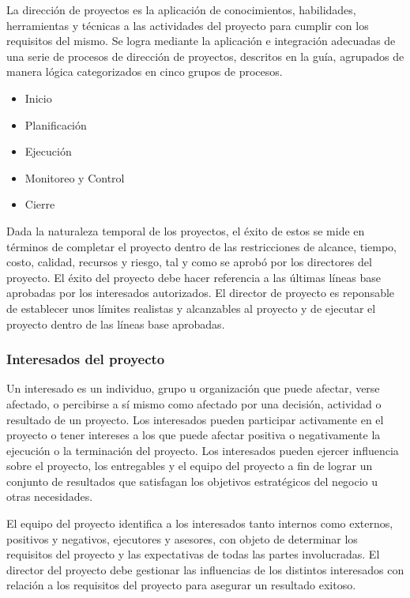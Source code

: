 La dirección de proyectos es la aplicación de conocimientos, habilidades, herramientas y técnicas a las actividades del proyecto para cumplir con los requisitos del mismo. Se logra mediante la aplicación e integración adecuadas de una serie de procesos de dirección de proyectos, descritos en la guía, agrupados de manera lógica categorizados en cinco grupos de procesos.

\begin{itemize}
\item{Inicio}
\item{Planificación}
\item{Ejecución}
\item{Monitoreo y Control}
\item{Cierre}
\end{itemize}

Dada la naturaleza temporal de los proyectos, el éxito de estos se mide en términos de completar el proyecto dentro de las restricciones de alcance, tiempo, costo, calidad, recursos y riesgo, tal y como se aprobó por los directores del proyecto. El éxito del proyecto debe hacer referencia a las últimas líneas base aprobadas por los interesados autorizados. El director de proyecto es reponsable de establecer unos límites realistas y alcanzables al proyecto y de ejecutar el proyecto dentro de las líneas base aprobadas.

\subsubsection{Interesados del proyecto}

Un  interesado  es  un  individuo,  grupo  u  organización  que  puede  afectar,  verse  afectado,  o  percibirse  a 
sí  mismo  como  afectado  por  una  decisión,  actividad  o  resultado  de  un  proyecto.  Los  interesados  pueden  participar activamente en el proyecto o tener intereses a los que puede afectar positiva o negativamente la ejecución o la terminación del proyecto. Los interesados pueden ejercer influencia sobre el proyecto, los entregables y el equipo del proyecto a fin de lograr un conjunto de resultados que satisfagan los objetivos estratégicos del negocio u otras necesidades.

El equipo del proyecto identifica a los interesados tanto internos como externos, positivos y negativos, ejecutores y asesores, con objeto de determinar los requisitos del proyecto y las expectativas de todas las partes involucradas. El director del proyecto debe gestionar las influencias de los distintos interesados con relación a los requisitos del proyecto para asegurar un resultado exitoso.

